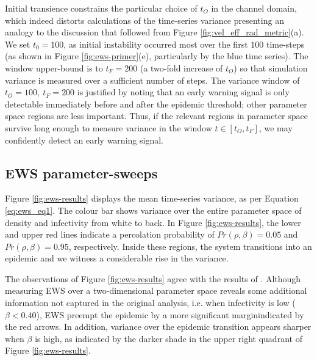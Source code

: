 Initial transience constrains the particular choice of $t_O$ in the channel domain, 
which indeed distorts calculations of the time-series variance\textemdash 
presenting an analogy to the discussion that followed from Figure \ref{fig:vel_eff_rad_metric}(a). 
We set $t_0=100$, as initial instability occurred most over the first $100$ time-steps 
(as shown in Figure \ref{fig:ews-primer}(e), particularly by the blue time series). 
The window upper-bound is to $t_F = 200$ (a two-fold increase of $t_O$) so that simulation variance is measured over a sufficient number of steps.
The variance window of $t_O=100,\ t_F=200$ is justified by noting that an early warning signal is only detectable immediately before 
and after the epidemic threshold; other parameter space regions are less important.
Thus, if the relevant regions in parameter space survive long enough to measure variance in the window $t \in [t_O, t_F]$, 
we may confidently detect an early warning signal.

\subsection{EWS parameter-sweeps}
\label{section:ews_slm}

Figure \ref{fig:ews-results} displays the mean time-series variance, as per Equation \ref{eq:ews_eq1}.
The colour bar shows variance over the entire parameter space of density and infectivity from white to back.
In Figure \ref{fig:ews-results}, the lower and upper red lines indicate a percolation probability of $Pr(\rho, \beta)=0.05$ and $Pr(\rho, \beta)=0.95$, respectively.
Inside these regions, the system transitions into an epidemic and we witness a considerable rise in the variance.

The observations of Figure \ref{fig:ews-results} agree with the results of \cite{OROZCOFUENTES201912}. 
Although measuring EWS over a two-dimensional parameter space reveals some additional information not captured in the original analysis, i.e. when infectivity is low ($\beta<0.40$), EWS preempt the epidemic by a more significant margin\textemdash indicated by the red arrows.
In addition, variance over the epidemic transition appears sharper when $\beta$ is high, as indicated by the darker shade in the upper right quadrant of Figure \ref{fig:ews-results}.

